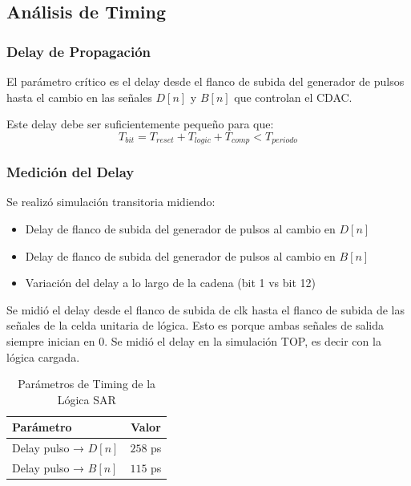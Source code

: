 \documentclass[12pt,a4paper]{report}
\begin{document}


\subsection{Análisis de Timing}

\subsubsection{Delay de Propagación}

El parámetro crítico es el delay desde el flanco de subida del generador de pulsos hasta el cambio en las señales $D[n]$ y $B[n]$ que controlan el CDAC.

Este delay debe ser suficientemente pequeño para que:
\begin{equation}
T_{bit} = T_{reset} + T_{logic} + T_{comp} < T_{periodo}
\end{equation}

\subsubsection{Medición del Delay}

Se realizó simulación transitoria midiendo:
\begin{itemize}
    \item Delay de flanco de subida del generador de pulsos al cambio en $D[n]$
    \item Delay de flanco de subida del generador de pulsos al cambio en $B[n]$
    \item Variación del delay a lo largo de la cadena (bit 1 vs bit 12)
\end{itemize}
Se midió el delay desde el flanco de subida de clk hasta el flanco de subida  de las señales de la celda unitaria de lógica. Esto es porque ambas señales de salida siempre inician en 0. Se midió el delay en la simulación TOP, es decir con la lógica cargada.

\begin{table}[H]
\centering
\caption{Parámetros de Timing de la Lógica SAR}
    \label{logretardostab}
\begin{tabular}{|l|c|}
\hline
\textbf{Parámetro} & \textbf{Valor} \\
\hline
Delay pulso → $D[n]$ & $258$ ps \\
Delay pulso → $B[n]$ & $115$ ps \\

\hline
\end{tabular}
\end{table}
\end{document}
